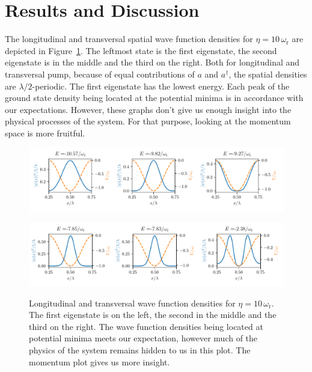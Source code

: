 \section{Results and Discussion}

The longitudinal and transversal spatial wave function densities for $\eta = 10 \, \omega_\text{r}$ are depicted in Figure~\ref{densities}. The leftmost state is the first eigenstate, the second eigenstate is in the middle and the third on the right. Both for longitudinal and transversal pump, because of equal contributions of $a$ and $a^\dagger$, the spatial densities are $\lambda / 2$-periodic. The first eigenstate has the lowest energy. Each peak of the ground state density being located at the potential minima is in accordance with our expectations. However, these graphs don't give us enough insight into the physical processes of the system. For that purpose, looking at the momentum space is more fruitful.

\begin{figure}[!htb]
	\begin{minipage}[b]{1\linewidth}
	\centering
	\includegraphics[width=1\textwidth]{images/dens_long.pdf}
	\label{long_density}
	\end{minipage}
%
	\begin{minipage}[b]{1\linewidth}
	\centering
	\includegraphics[width=1\textwidth]{images/dens_trans.pdf}
	\label{trans_density}
	\end{minipage}
\caption{Longitudinal and transversal wave function densities for $\eta = 10 \, \omega_\text{r}$. The first eigenstate is on the left, the second in the middle and the third on the right. The wave function densities being located at potential minima meets our expectation, however much of the physics of the system remains hidden to us in this plot. The momentum plot gives us more insight.}
\label{densities}
\end{figure}
\FloatBarrier

